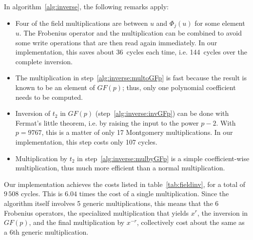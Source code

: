 \documentclass{llncs}
\newcommand{\GF}{GF}
\begin{document}
In algorithm~\ref{alg:inverse}, the following remarks apply:
\begin{itemize}

    \item Four of the field multiplications are between $u$ and
    $\Phi_j(u)$ for some element $u$. The Frobenius operator and
    the multiplication can be combined to avoid some write operations
    that are then read again immediately. In our implementation, this
    saves about 36~cycles each time, i.e. 144~cycles over the complete
    inversion.

    \item The multiplication in step~\ref{alg:inverse:multoGFp} is fast
    because the result is known to be an element of $\GF(p)$; thus, only
    one polynomial coefficient needs to be computed.

    \item Inversion of $t_2$ in $\GF(p)$ (step~\ref{alg:inverse:invGFp})
    can be done with Fermat's little theorem, i.e. by raising the input
    to the power $p-2$. With $p = 9767$, this is a matter of only 17
    Montgomery multiplications. In our implementation, this step costs
    only 107 cycles.

    \item Multiplication by $t_2$ in step~\ref{alg:inverse:mulbyGFp} is
    a simple coefficient-wise multiplication, thus much more efficient
    than a normal multiplication.

\end{itemize}

Our implementation achieves the costs listed in
table~\ref{tab:fieldinv}, for a total of $9\,508$ cycles. This is $6.04$
times the cost of a single multiplication. Since the algorithm itself
involves 5 generic multiplications, this means that the 6 Frobenius
operators, the specialized multiplication that yields $x^r$, the
inversion in $\GF(p)$, and the final multiplication by $x^{-r}$,
collectively cost about the same as a 6th generic multiplication.
\end{document}
